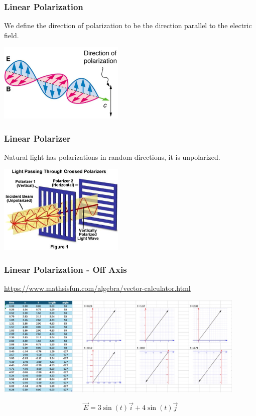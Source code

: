 \documentclass{beamer}
\begin{document}
\begin{frame}\frametitle{Linear Polarization}

We define the direction of polarization to be the direction parallel to the electric field.

\begin{center}
\includegraphics[width=6cm]{fig/polarization1.png}
\end{center}

\end{frame}

\begin{frame}\frametitle{Linear Polarizer}

Natural light has polarizations in random directions, it is unpolarized.

\begin{center}
\includegraphics[width=6cm]{fig/polarizer.jpg}
\end{center}

\end{frame}


\begin{frame}\frametitle{Linear Polarization - Off Axis}

\url{https://www.mathsisfun.com/algebra/vector-calculator.html}

\begin{center}
\includegraphics[width=12cm]{fig/pol1.jpg}
\end{center}

\begin{equation}
\vec{E} = 3 \sin{(t)} \vec{i} + 4 \sin{(t)} \vec{j}
\end{equation}

\end{frame}
\end{document}
